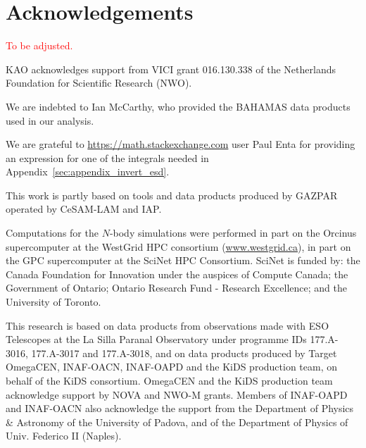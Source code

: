 \documentclass[usenatbib]{mnras}
\begin{document}
\section*{Acknowledgements}
\textcolor{red}{To be adjusted.}

KAO acknowledges support from VICI grant 016.130.338 of the Netherlands Foundation for Scientific Research (NWO).

We are indebted to Ian McCarthy, who provided the BAHAMAS data products used in our analysis.

We are grateful to \url{https://math.stackexchange.com} user Paul Enta for providing an expression for one of the integrals needed in Appendix~\ref{sec:appendix_invert_esd}.

This work is partly based on tools and data products produced by GAZPAR operated by CeSAM-LAM and IAP.


Computations for the $N$-body simulations were performed in part on the Orcinus supercomputer at the WestGrid HPC consortium (\url{www.westgrid.ca}), in part on the GPC supercomputer at the SciNet HPC Consortium. SciNet is funded by: the Canada Foundation for Innovation under the auspices of Compute Canada; the Government of Ontario; Ontario Research Fund - Research Excellence; and the University of Toronto.

This research is based on data products from observations made with ESO Telescopes at the La Silla Paranal Observatory under programme IDs 177.A-3016, 177.A-3017 and 177.A-3018, and on data products produced by Target OmegaCEN, INAF-OACN, INAF-OAPD and the KiDS production team, on behalf of the KiDS consortium. OmegaCEN and the KiDS production team acknowledge support by NOVA and NWO-M grants. Members of INAF-OAPD and INAF-OACN also acknowledge the support from the Department of Physics \& Astronomy of the University of Padova, and of the Department of Physics of Univ. Federico II (Naples).
\end{document}
